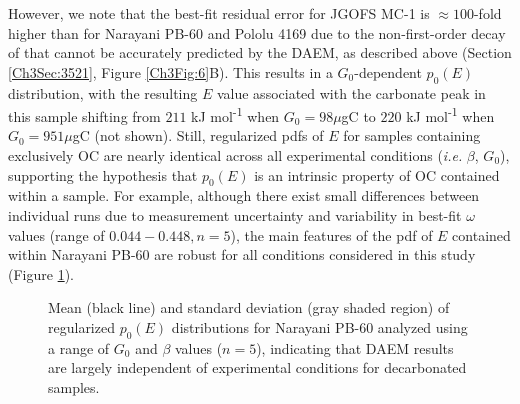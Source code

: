 However, we note that the best-fit residual error for JGOFS MC-1 is $\approx 100$-fold higher than for Narayani PB-60 and Pololu 4169 due to the non-first-order decay of  that cannot be accurately predicted by the DAEM, as described above (Section \ref{Ch3Sec:3521}, Figure \ref{Ch3Fig:6}B). This results in a $G_{0}$-dependent $p_{0}(E)$ distribution, with the resulting $E$ value associated with the carbonate peak in this sample shifting from $211$ kJ mol\textsuperscript{-1} when $G_{0}=98\mu$gC to $220$ kJ mol\textsuperscript{-1} when $G_{0}=951\mu$gC (not shown). Still, regularized pdfs of $E$ for samples containing exclusively OC are nearly identical across all experimental conditions (\textit{i.e.} $\beta$, $G_{0}$), supporting the hypothesis that $p_{0}(E)$ is an intrinsic property of OC contained within a sample. For example, although there exist small differences between individual runs due to measurement uncertainty and variability in best-fit $\omega$ values (range of $0.044 - 0.448, n=5$), the main features of the pdf of $E$ contained within Narayani PB-60 are robust for all conditions considered in this study (Figure \ref{Ch3Fig:7}). 

\begin{figure}[t]
	\caption[$p_{0}(E)$ distributions for Narayani PB-60 under all experimental conditions]{Mean (black line) and standard deviation (gray shaded region) of regularized $p_{0}(E)$ distributions for Narayani PB-60 analyzed using a range of $G_{0}$ and $\beta$ values ($n = 5$), indicating that DAEM results are largely independent of experimental conditions for decarbonated samples.}
	\label{Ch3Fig:7} 
\end{figure}

